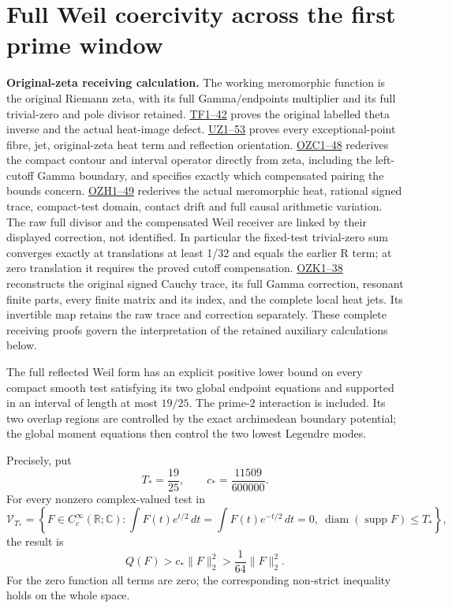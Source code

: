 \documentclass[
  10pt,
  a4paper,
]{article}
\author{}
\date{}
\begin{document}
{
\setcounter{tocdepth}{3}
\tableofcontents
}
\section{Full Weil coercivity across the first prime
window}\label{full-weil-coercivity-across-the-first-prime-window}

\textbf{Original-zeta receiving calculation.} The working meromorphic
function is the original Riemann zeta, with its full Gamma/endpoints
multiplier and its full trivial-zero and pole divisor retained.
\href{FAITHFUL_THETA_COMPLETION_RETURN.md}{TF1--42} proves the original
labelled theta inverse and the actual heat-image defect.
\href{FAITHFUL_UNCOMPLETED_ZETA_HEAT.md}{UZ1--53} proves every
exceptional-point fibre, jet, original-zeta heat term and reflection
orientation.
\href{ORIGINAL_ZETA_COMPACT_WEIL_RECONSTRUCTION.md}{OZC1--48} rederives
the compact contour and interval operator directly from zeta, including
the left-cutoff Gamma boundary, and specifies exactly which compensated
pairing the bounds concern.
\href{ORIGINAL_ZETA_HEAT_CONTACT_RECONSTRUCTION.md}{OZH1--49} rederives
the actual meromorphic heat, rational signed trace, compact-test domain,
contact drift and full causal arithmetic variation. The raw full divisor
and the compensated Weil receiver are linked by their displayed
correction, not identified. In particular the fixed-test trivial-zero
sum converges exactly at translations at least 1/32 and equals the
earlier R term; at zero translation it requires the proved cutoff
compensation. \href{ORIGINAL_ZETA_CAUCHY_RECONSTRUCTION.md}{OZK1--38}
reconstructs the original signed Cauchy trace, its full Gamma
correction, resonant finite parts, every finite matrix and its index,
and the complete local heat jets. Its invertible map retains the raw
trace and correction separately. These complete receiving proofs govern
the interpretation of the retained auxiliary calculations below.

The full reflected Weil form has an explicit positive lower bound on
every compact smooth test satisfying its two global endpoint equations
and supported in an interval of length at most \(19/25\). The
prime-\(2\) interaction is included. Its two overlap regions are
controlled by the exact archimedean boundary potential; the global
moment equations then control the two lowest Legendre modes.

Precisely, put \[
T_*=\frac{19}{25},\qquad c_*=\frac{11509}{600000}.
\tag{FC1}
\] For every nonzero complex-valued test in \[
\mathcal V_{T_*}=
\left\{F\in C_c^\infty(\mathbb R;\mathbb C):
\int F(t)e^{t/2}\,dt=\int F(t)e^{-t/2}\,dt=0,\
\operatorname{diam}(\operatorname{supp}F)\le T_*\right\},
\] the result is \[
\boxed{Q(F)>c_*\|F\|_2^2>\frac1{64}\|F\|_2^2.}
\tag{FC2}
\] For the zero function all terms are zero; the corresponding
non-strict inequality holds on the whole space.
\end{document}
